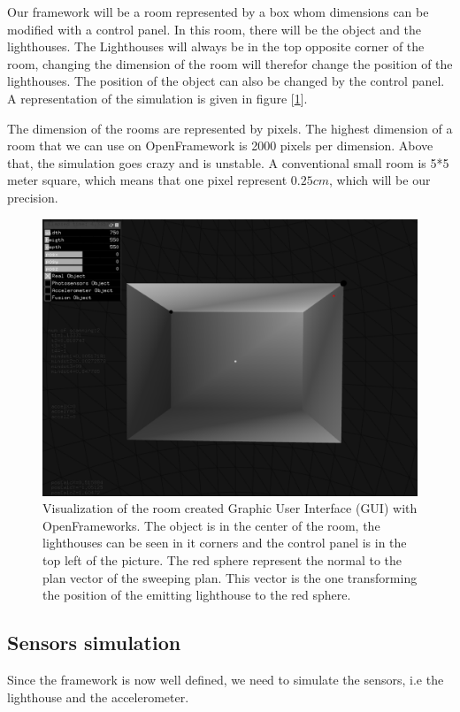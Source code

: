 \documentclass{vldb}
\begin{document}
Our framework will be a room represented by a box whom dimensions can be modified with a control panel. In this room, there will be the object and the lighthouses. The Lighthouses will always be in the top opposite corner of the room, changing the dimension of the room will therefor change the position of the lighthouses. The position of the object can also be changed by the control panel. A representation of the simulation is given in figure [\ref{im:gui}].\newline

The dimension of the rooms are represented by pixels. The highest dimension of a room that we can use on OpenFramework is 2000 pixels per dimension. Above that, the simulation goes crazy and is unstable. A conventional small room is 5*5 meter square, which means that one pixel represent $0.25 cm$, which will be our precision.

\begin{figure}[h!]
  \includegraphics[scale = 0.24]{Image/gui3.png}
  \caption{Visualization of the room created Graphic User Interface (GUI) with OpenFrameworks. The object is in the center of the room, the lighthouses can be seen in it corners and the control panel is in the top left of the picture. The red sphere represent the normal to the plan vector of the sweeping plan. This vector is the one transforming the position of the emitting lighthouse to the red sphere.}
  \label{im:gui}
\end{figure}



\subsection{Sensors simulation} \label{Sim}
Since the framework is now well defined, we need to simulate the sensors, i.e the lighthouse and the accelerometer.
\end{document}
